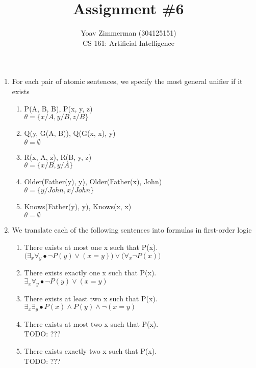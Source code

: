 \documentclass[12pt]{article}
\begin{document}
\title{Assignment \#6}
\author{Yoav Zimmerman (304125151) \\
	    CS 161: Artificial Intelligence}
\maketitle


\begin{enumerate}

	\item For each pair of atomic sentences, we specify the most general unifier if it exists
		\begin{enumerate}
			\item P(A, B, B), P(x, y, z) \\
				$ \theta = \{ x/A, y/B, z/B \} $
			\item Q(y, G(A, B)), Q(G(x, x), y) \\
				$ \theta = \emptyset $
			\item R(x, A, z), R(B, y, z) \\
				$ \theta = \{ x/B, y/A \} $
			\item Older(Father(y), y), Older(Father(x), John) \\
				$ \theta = \{ y/John, x/John \} $
			\item Knows(Father(y), y), Knows(x, x) \\
				$ \theta = \emptyset $
		\end{enumerate}
		
	\item We translate each of the following sentences into formulas in first-order logic
		\begin{enumerate}
			\item There exists at most one x such that P(x). \\
				$\big( \exists_x \forall_y \bullet \neg P(y) \lor (x = y) \big) \lor \big( \forall_x \neg P(x) \big)$
			\item There exists exactly one x such that P(x). \\
				$\exists_x \forall_y \bullet \neg P(y) \lor (x = y)$
			\item There exists at least two x such that P(x). \\
				$\exists_x \exists_y \bullet P(x) \land P(y) \land \neg (x = y)$
			\item There exists at most two x such that P(x). \\
				TODO: ???
			\item There exists exactly two x such that P(x). \\
				TODO: ???
		\end{enumerate}


\end{enumerate}
\end{document}
